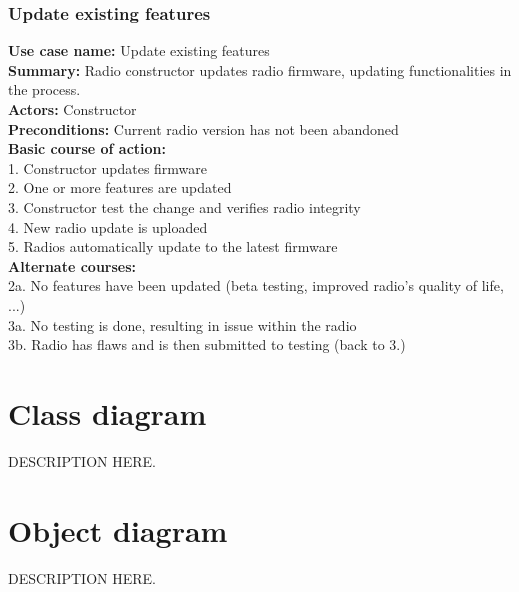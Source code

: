 \documentclass[11pt]{article}
\begin{document}
\subsubsection{Update existing features}
\textbf{Use case name:} Update existing features\\
\textbf{Summary:} Radio constructor updates radio firmware, updating functionalities in the process.\\
\textbf{Actors:} Constructor\\
\textbf{Preconditions:} Current radio version has not been abandoned\\
\textbf{Basic course of action:}\\
\hspace*{10mm}1. Constructor updates firmware\\
\hspace*{10mm}2. One or more features are updated\\
\hspace*{10mm}3. Constructor test the change and verifies radio integrity\\
\hspace*{10mm}4. New radio update is uploaded\\
\hspace*{10mm}5. Radios automatically update to the latest firmware\\
\textbf{Alternate courses:}\\
\hspace*{10mm}2a. No features have been updated (beta testing, improved radio's quality of life, ...)\\
\hspace*{10mm}3a. No testing is done, resulting in issue within the radio\\
\hspace*{10mm}3b. Radio has flaws and is then submitted to testing (back to 3.)\\

\pagebreak
\section{Class diagram}
\vspace{10px}
\begin{center}
\end{center}
DESCRIPTION HERE.

\pagebreak
\section{Object diagram}
\vspace{10px}
\begin{center}
\end{center}
DESCRIPTION HERE.
\end{document}
